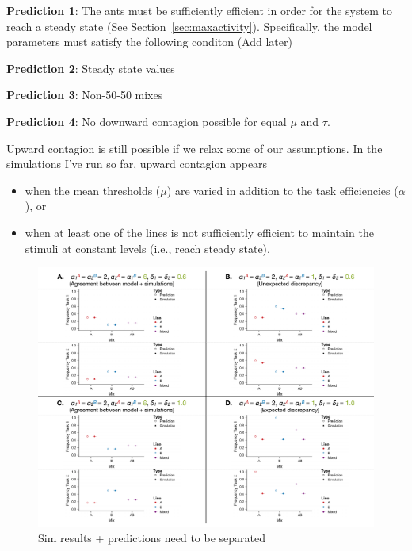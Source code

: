 \documentclass[11pt]{article}
\newcommand{\later}{{\color{red}(Add later)}}
\begin{document}
\textbf{Prediction 1}: The ants must be sufficiently efficient in order for the system to reach a steady state (See Section~\ref{sec:maxactivity}). Specifically, the model parameters must satisfy the following conditon \later

\textbf{Prediction 2}: Steady state values

\textbf{Prediction 3}: Non-50-50 mixes

\textbf{Prediction 4}: No downward contagion possible for equal $\mu$ and $\tau$.


Upward contagion is still possible if we relax some of our assumptions. In the simulations I've run so far, upward contagion appears
\begin{itemize}
    \item when the mean thresholds ($\mu$) are varied in addition to the task efficiencies ($\alpha$), or
    \item when at least one of the lines is not sufficiently efficient to maintain the stimuli at constant levels (i.e., reach steady state).
\end{itemize}

\begin{figure}[H]
    \centering
    \includegraphics[trim={0 0.25in 0 0.2in}, clip, width=0.95\linewidth]{5050_comparison.pdf}
    \caption{Sim results + predictions need to be separated}
    \label{fig:5050comp}
\end{figure}
\end{document}
